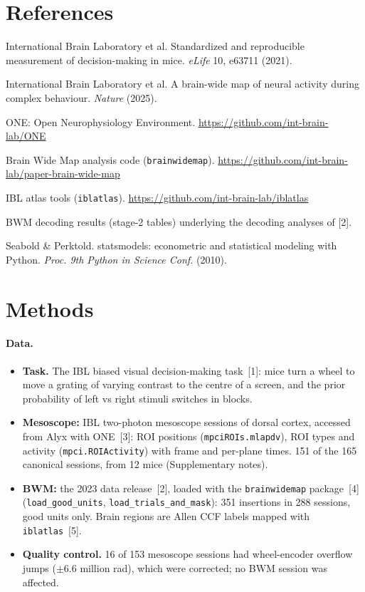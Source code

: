 \documentclass[10pt]{article}
\begin{document}
\section*{References}
\begin{enumerate}[label={[\arabic*]},leftmargin=2em]
  \item International Brain Laboratory et al. Standardized and reproducible measurement of decision-making in mice. \emph{eLife} 10, e63711 (2021).
  \item International Brain Laboratory et al. A brain-wide map of neural activity during complex behaviour. \emph{Nature} (2025).
  \item ONE: Open Neurophysiology Environment. \url{https://github.com/int-brain-lab/ONE}
  \item Brain Wide Map analysis code (\texttt{brainwidemap}). \url{https://github.com/int-brain-lab/paper-brain-wide-map}
  \item IBL atlas tools (\texttt{iblatlas}). \url{https://github.com/int-brain-lab/iblatlas}
  \item BWM decoding results (stage-2 tables) underlying the decoding analyses of [2].
  \item Seabold \& Perktold. statsmodels: econometric and statistical modeling with Python. \emph{Proc. 9th Python in Science Conf.} (2010).
\end{enumerate}

\FloatBarrier
\section*{Methods}
\paragraph{Data.}
\begin{itemize}
  \item \textbf{Task.} The IBL biased visual decision-making task~[1]: mice turn a wheel to move a grating of varying contrast to the centre of a screen, and the prior probability of left vs right stimuli switches in blocks.
  \item \textbf{Mesoscope:} IBL two-photon mesoscope sessions of dorsal cortex, accessed from Alyx with ONE~[3]: ROI positions (\texttt{mpciROIs.mlapdv}), ROI types and activity (\texttt{mpci.ROIActivity}) with frame and per-plane times. 151 of the 165 canonical sessions, from 12 mice (Supplementary notes).
  \item \textbf{BWM:} the 2023 data release~[2], loaded with the \texttt{brainwidemap} package~[4] (\texttt{load\_good\_units}, \texttt{load\_trials\_and\_mask}): 351 insertions in 288 sessions, good units only. Brain regions are Allen CCF labels mapped with \texttt{iblatlas}~[5].
  \item \textbf{Quality control.} 16 of 153 mesoscope sessions had wheel-encoder overflow jumps ($\pm$6.6 million rad), which were corrected; no BWM session was affected.
\end{itemize}
\end{document}
